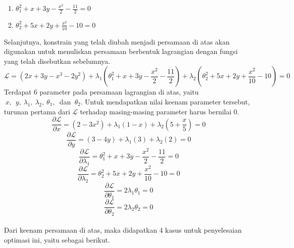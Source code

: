 \documentclass{article}
\begin{document}
\begin{enumerate}[label=(\alph*)]
\centering
    \item \(\theta_1^2+x+3y-\frac{x^2}{2} - \frac{11}{2}=0\)
    \item \(\theta_2^2+5x+2y+\frac{x^2}{10} - 10=0\)
\end{enumerate}
Selanjutnya, konstrain yang telah diubah menjadi persamaan di atas akan digunakan untuk menuliskan persamaan berbentuk lagrangian dengan fungsi yang telah disebutkan sebelumnya.
\[\mathcal{L}=(2x+3y-x^3-2y^2)+\lambda_1(\theta_1^2+x+3y-\frac{x^2}{2} - \frac{11}{2})+\lambda_2(\theta_2^2+5x+2y+\frac{x^2}{10} - 10)=0\]
Terdapat 6 parameter pada persamaan lagrangian di atas, yaitu \(\ x,\ \ y,\ \lambda_1,\ \lambda_2,\ \theta_1,\ \) dan \(\ \theta_2\). Untuk mendapatkan nilai keenam parameter tersebut, turunan pertama dari \(\mathcal{L}\) terhadap masing-masing parameter harus bernilai 0.
\begin{equation}
    \frac{\partial \mathcal{L}}{\partial x}=(2-3x^2)+\lambda_1(1-x)+\lambda_2(5+\frac{x}{5})=0
\end{equation}
\begin{equation}
    \frac{\partial \mathcal{L}}{\partial y}=(3-4y)+\lambda_1(3)+\lambda_2(2)=0
\end{equation}
\begin{equation}
    \frac{\partial \mathcal{L}}{\partial \lambda_1}=\theta_1^2+x+3y-\frac{x^2}{2}-\frac{11}{2}=0
\end{equation}
\begin{equation}
    \frac{\partial \mathcal{L}}{\partial \lambda_2}=\theta_2^2+5x+2y+\frac{x^2}{10}-10=0
\end{equation}
\begin{equation}
    \frac{\partial \mathcal{L}}{\partial \theta_1}=2 \lambda_1 \theta_1=0
\end{equation}
\begin{equation}
    \frac{\partial \mathcal{L}}{\partial \theta_2}=2 \lambda_2 \theta_2=0
\end{equation}
\\
Dari keenam persamaan di atas, maka didapatkan 4 kasus untuk penyelesaian optimasi ini, yaitu sebagai berikut.
\end{document}
